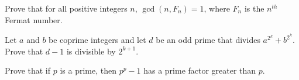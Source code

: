 \documentclass{subfile}
\begin{document}
	\begin{problem}
		Prove that for all positive integers $n$, $\gcd(n, F_n) = 1$, where $F_n$ is the $n^{th}$ Fermat number. %
	\end{problem}
	
	
	\begin{problem}
		Let $a$ and $b$ be coprime integers and let $d$ be an odd prime that divides $a^{2^{k}}+b^{2^{k}}$. Prove that $d-1$ is divisible by $2^{k+1}$. %
	\end{problem}
	
	
	\begin{problem}
		Prove that if $p$ is a prime, then $p^p-1$ has a prime factor greater than $p$. %
	\end{problem}
	
\end{document}
